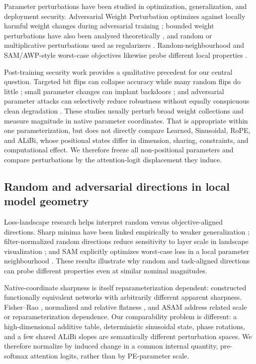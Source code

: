 \documentclass[preprint,12pt,authoryear]{elsarticle}
\begin{document}
Parameter perturbations have been studied in optimization, generalization,
and deployment security. Adversarial Weight Perturbation optimizes against
locally harmful weight changes during adversarial training
\citep{wu2020adversarial}; bounded weight perturbations have also been
analysed theoretically \citep{tsai2021formalizing}, and random or
multiplicative perturbations used as regularizers
\citep{trinh2024multiplicative}. Random-neighbourhood and SAM/AWP-style
worst-case objectives likewise probe different local properties
\citep{li2024randomweight}.

Post-training security work provides a qualitative precedent for our
central question. Targeted bit flips can collapse accuracy while many
random flips do little \citep{rakin2019bitflip}; small parameter changes can
implant backdoors \citep{garg2020backdoors}; and adversarial parameter
attacks can selectively reduce robustness without equally conspicuous clean
degradation \citep{yu2023adversarial}. These studies usually perturb broad
weight collections and measure magnitude in native parameter coordinates.
That is appropriate within one parameterization, but does not directly
compare Learned, Sinusoidal, RoPE, and ALiBi, whose positional states differ
in dimension, sharing, constraints, and computational effect. We therefore
freeze all non-positional parameters and compare perturbations by the
attention-logit displacement they induce.

\subsection{Random and adversarial directions in local model geometry}

Loss-landscape research helps interpret random versus objective-aligned
directions. Sharp minima have been linked empirically to weaker
generalization \citep{keskar2017largebatch}; filter-normalized random
directions reduce sensitivity to layer scale in landscape visualization
\citep{li2018loss}; and SAM explicitly optimizes worst-case loss in a local
parameter neighbourhood \citep{foret2021sam}. These results illustrate why
random and task-aligned directions can probe different properties even at
similar nominal magnitudes.

Native-coordinate sharpness is itself reparameterization dependent:
\citet{dinh2017sharp} constructed functionally equivalent networks with
arbitrarily different apparent sharpness. Fisher--Rao
\citep{liang2019fisherrao}, normalized and relative flatness
\citep{tsuzuku2020normalized,petzka2021relative}, and ASAM
\citep{kwon2021asam} address related scale or reparameterization
dependence. Our comparability problem is different: a high-dimensional
additive table, deterministic sinusoidal state, phase rotations, and a few
shared ALiBi slopes are semantically different perturbation spaces. We
therefore normalize by induced change in a common internal quantity,
pre-softmax attention logits, rather than by PE-parameter scale.
\end{document}
